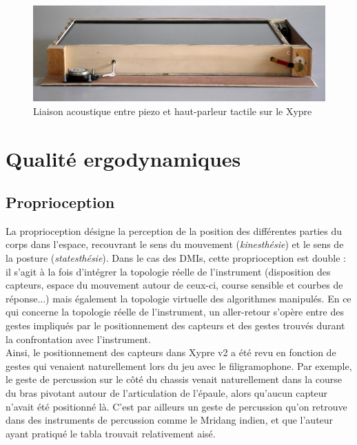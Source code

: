 \begin{figure}[!htbp]
	\includegraphics[width=\textwidth]{gfx/05_interfaces/Xypre_FrontPanel_144dpi.jpg}
	\caption{Liaison acoustique entre piezo et haut-parleur tactile sur le Xypre}
	\label{fig:interface:xypre_v2-hppiezo}
\end{figure}


\section{Qualité ergodynamiques}


\subsection{Proprioception}
\noindent La proprioception désigne la perception de la position des différentes parties du corps dans l'espace, recouvrant le sens du mouvement (\textit{kinesthésie}) et le sens de la posture (\textit{statesthésie}). Dans le cas des \glspl{DMI}, cette proprioception est double : il s'agit à la fois d'intégrer la topologie réelle de l'instrument (disposition des capteurs, espace du mouvement autour de ceux-ci, course sensible et courbes de réponse...) mais également la topologie virtuelle des algorithmes manipulés. 
En ce qui concerne la topologie réelle de l'instrument, un aller-retour s'opère entre des gestes impliqués par le positionnement des capteurs et des gestes trouvés durant la confrontation avec l'instrument.\\
\indent Ainsi, le positionnement des capteurs dans Xypre v2 a été revu en fonction de gestes qui venaient naturellement lors du jeu avec le filigramophone. Par exemple, le geste de percussion sur le côté du chassis venait naturellement dans la course du bras pivotant autour de l'articulation de l'épaule, alors qu'aucun capteur n'avait été positionné là. C'est par ailleurs un geste de percussion qu'on retrouve dans des instruments de percussion comme le Mridang indien, et que l'auteur ayant pratiqué le tabla trouvait relativement aisé.

